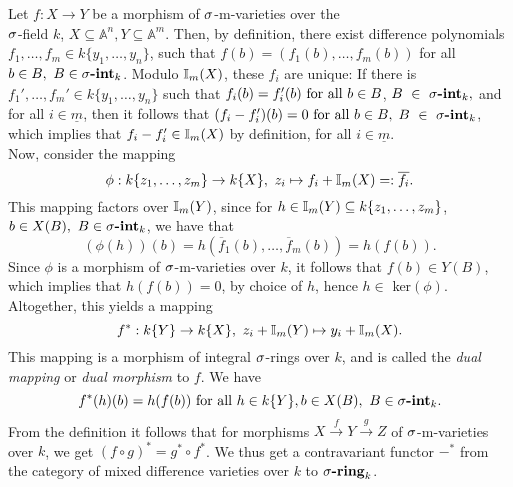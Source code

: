 \begin{rem}\label{dualmor}
Let $f: X \rightarrow Y$ be a morphism of $\sigma$-m-varieties over the \\ $\sigma$-field $k$, $X \subseteq \mathbb{A}^n, Y \subseteq \mathbb{A}^m$. Then, by definition, there exist difference polynomials $f_1, \ldots, f_m \in k\{y_1,\ldots,y_n\}$, such 
that $f(b) = (f_1(b),\ldots,f_m(b))$ for all $b \in B, ~ B \in \sigma\text{{\normalfont\textbf{-int}}}_k$. Modulo $\mathbb{I}_m(X)$, these $f_i$ are unique:
 If there is $f_1', \ldots, f_m' \in k\{y_1,\ldots,y_n\}$ such that $f_i(b) = f'_i(b) \text{ for all } b \in B$, $B~\in~\sigma\text{{\normalfont\textbf{-int}}}_k,$ and for all $i \in \underline{m}$,
then it follows that $(f_i - f_i')(b) = 0 \text{ for all } b \in B,$ $B~\in~\sigma\text{{\normalfont\textbf{-int}}}_k$, which implies that $f_i - f_i' \in \mathbb{I}_m(X)$ by definition, for all $i \in \underline{m}$. \\
\indent Now, consider the mapping \[ \phi: k\{z_1,\ldots,z_m \} \rightarrow k\{X\}, ~ z_i \mapsto f_i + \mathbb{I}_m(X) =: \overline{f_i}. \]
This mapping factors over $\mathbb{I}_m(Y)$, since for $h \in \mathbb{I}_m(Y) \subseteq k\{z_1,\ldots,z_m\}$, $b \in X(B), ~ B \in \sigma\text{{\normalfont\textbf{-int}}}_k$, we have that 
\[ (\phi(h))(b) = h(\overline f_1(b), \ldots, \overline f_m(b)) = h(f(b)). \]
Since $\phi$ is a morphism of $\sigma$-m-varieties over $k$, it follows that $f(b) \in Y(B)$, which implies that $h(f(b)) = 0$, by choice of $h$, hence $h \in $ ker$(\phi)$.
Altogether, this yields a mapping 
\[ f^* : k\{Y\} \rightarrow k\{X\}, ~ z_i + \mathbb{I}_m(Y) \mapsto y_i + \mathbb{I}_m(X). \]
This mapping is a morphism of integral $\sigma$-rings over $k$, and is called the \emph{dual mapping} or \emph{dual morphism} to $f$. We have
\[ f^*(h)(b) = h(f(b)) \text{ for all } h \in k\{Y\}, b \in X(B), ~ B \in \sigma\text{{\normalfont\textbf{-int}}}_k. \]
From the definition it follows that for morphisms $X \xrightarrow{f} Y \xrightarrow{g} Z$ of $\sigma$-m-varieties over $k$, we get $ (f \circ g)^* = g^* \circ f^*$. 
We thus get a contravariant functor $-^*$ from the category of mixed difference varieties over $k$ to $\sigma\text{{\normalfont\textbf{-ring}}}_k$.
\end{rem}

